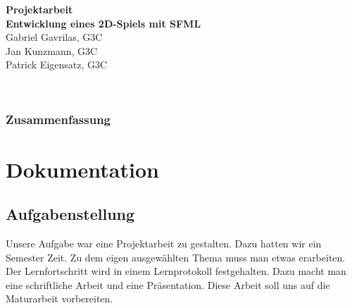 \documentclass[11pt,a4paper]{scrbook}
\begin{document}
\begin{titlepage}
\begin{center}

\vspace*{3cm}
\textbf{\huge{Projektarbeit}}\\
\vspace*{2cm}
\textbf{\large{Entwicklung eines 2D-Spiels mit SFML}}\\
\vspace*{5cm}
Gabriel Gavrilas, G3C\\
Jan Kunzmann, G3C\\
Patrick Eigensatz, G3C
\end{center}
\end{titlepage}


\clearpage
\thispagestyle{empty}

\mbox{ }
\clearpage

\setcounter{page}{1}
\section*{Zusammenfassung}

\clearscrheadfoot
\lohead[\pagemark]{\pagemark}
\rehead[\pagemark]{\pagemark}
\tableofcontents

\part{Dokumentation}
\chapter{Aufgabenstellung} 
Unsere Aufgabe war eine Projektarbeit zu gestalten. Dazu hatten wir ein Semester Zeit.
Zu dem eigen ausgewählten Thema muss man etwas erarbeiten. Der Lernfortschritt wird in einem Lernprotokoll festgehalten.
Dazu macht man eine schriftliche Arbeit und eine Präsentation. Diese Arbeit soll uns auf die Maturarbeit vorbereiten.
\end{document}
